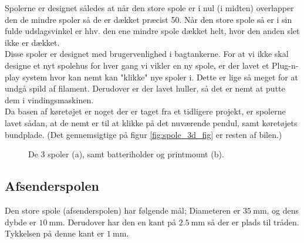 Spolerne er designet således at når den store spole er i nul (i midten) overlapper den de mindre spoler så de er dækket præcist 50\percent. Når den store spole så er i sin fulde udslagsvinkel er hhv. den ene mindre spole dækket helt, hvor den anden slet ikke er dækket. \\

Disse spoler er designet med brugervenlighed i bagtankerne. For at vi ikke skal designe et nyt spolehus for hver gang vi vikler en ny spole, er der lavet et Plug-n-play system hvor kan nemt kan "klikke" nye spoler i. Dette er lige så meget for at undgå spild af filament. Derudover er der lavet huller, så det er nemt at putte dem i vindingsmaskinen. \\

Da basen af køretøjet er noget der er taget fra et tidligere projekt, er spolerne lavet sådan, at de nemt er til at klikke på det nuværende pendul, samt køretøjets bundplade. (Det gennemsigtige på figur \ref{fig:spole_3d_fig} er resten af bilen.)

\begin{figure}[h!]
	\centering
	\caption{De 3 spoler (a), samt batteriholder og printmount (b).}
\end{figure}

\subsection{Afsenderspolen}
Den store spole (afsenderspolen) har følgende mål; 
Diameteren er $\SI{35}{\milli\meter}$, og dens dybde er $\SI{10}{\milli\meter}$. Derudover har den en kant på $\SI{2.5}{\milli\meter}$ så der er plads til tråden. Tykkelsen på denne kant er $\SI{1}{\milli\meter}$. 


